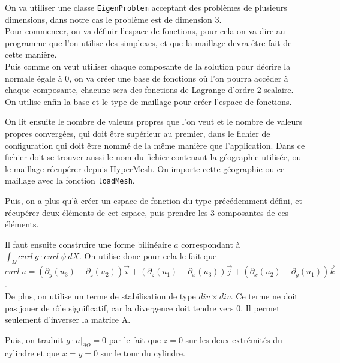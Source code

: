 \iffalse

On va utiliser une classe \texttt{EigenProblem} acceptant des problèmes de plusieurs dimensions, dans notre cas le problème est de dimension 3.\\
Pour commencer, on va définir l'espace de fonctions, pour cela on va dire au programme que l'on utilise des simplexes, et que la maillage devra être fait de cette manière.\\
Puis comme on veut utiliser chaque composante de la solution pour décrire la normale égale à 0, on va créer une base de fonctions où l'on pourra accéder à chaque composante, chacune sera des fonctions de Lagrange d'ordre 2 scalaire.\\
On utilise enfin la base et le type de maillage pour créer l'espace de fonctions.



On lit ensuite le nombre de valeurs propres que l'on veut et le nombre de valeurs propres convergées, qui doit être supérieur au premier, dans le fichier de configuration qui doit être nommé de la même manière que l'application. Dans ce fichier doit se trouver aussi le nom du fichier contenant la géographie utilisée, ou le maillage récupérer depuis HyperMesh. On importe cette géographie ou ce maillage avec la fonction \texttt{loadMesh}.



Puis, on a plus qu'à créer un espace de fonction du type précédemment défini, et récupérer deux éléments de cet espace, puis prendre les 3 composantes de ces éléments.



Il faut ensuite construire une forme bilinéaire $a$ correspondant à $\int_\Omega curl\ g\cdot curl\ \psi\ dX$. On utilise donc pour cela le fait que $curl\ u = (\partial_y(u_3)-\partial_z(u_2))\vec{i} + (\partial_z(u_1) - \partial_x(u_3))\vec{j} + (\partial_x(u_2)-\partial_y(u_1))\vec{k}$.\\
De plus, on utilise un terme de stabilisation de type $div \times div$. Ce terme ne doit pas jouer de rôle significatif, car la divergence doit tendre vers 0. Il permet seulement d'inverser la matrice A.



Puis, on traduit $g\cdot n\big\rvert_{\partial\Omega}=0$ par le fait que $z=0$ sur les deux extrémités du cylindre et que $x=y=0$ sur le tour du cylindre.

